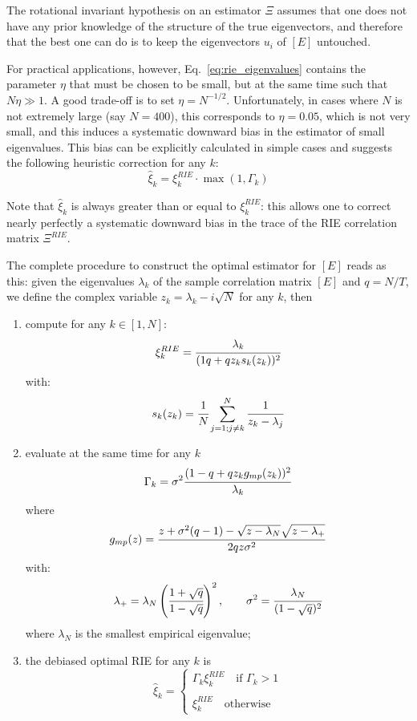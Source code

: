 The rotational invariant hypothesis on an estimator $\Xi$ assumes that one does not have any prior knowledge of the structure of the true eigenvectors, and therefore that the best one can do is to keep the eigenvectors $u_i$ of $[E]$ untouched.

For practical applications, however, Eq.~\ref{eq:rie_eigenvalues} contains the parameter $\eta$ that must be chosen to be small, but at the same time such that $N\eta \gg 1$. A good trade-off is to set $\eta = N^{-1/2}$. Unfortunately, in cases where $N$ is not extremely large (say $N = 400$), this corresponds to $\eta = 0.05$, which is not very small, and this induces a systematic downward bias in the estimator of small
eigenvalues. This bias can be explicitly calculated in simple cases and suggests the following heuristic correction for any $k$:
\begin{equation}
\hat{\xi}_k = \xi^{RIE}_k \cdot \max(1, \Gamma_k)
\end{equation}

Note that $\hat{\xi}_k$ is always greater than or equal to $\xi^{RIE}_k$: this allows one to correct nearly perfectly a systematic
downward bias in the trace of the RIE correlation matrix $\Xi^{RIE}$.

The complete procedure to construct the optimal estimator for $[E]$ reads as this: given the eigenvalues $\lambda_k$ of the sample correlation matrix $[E]$ and $q=N/T$, we define the complex variable $z_k =\lambda_k-i\sqrt{N}$ for any $k$, then

\begin{enumerate}
\item compute for any $k\in[1,N]$:
\begin{equation}
\xi^{RIE}_k=\cfrac{\lambda_k}{(1q+qz_ks_k(z_k))^2}
\end{equation}
with:
\begin{equation}
s_k(z_k)=\cfrac{1}{N}\sum_{j=1;j\neq k}^{N}\cfrac{1}{z_k-\lambda_j}
\end{equation}
\item evaluate at the same time for any $k$
\begin{equation}
\Gamma_k=\sigma^2\cfrac{(1-q+q z_k g_{mp}(z_k))^2}{\lambda_k}
\end{equation}
where
\begin{equation}
g_{mp}(z) = \cfrac{z+\sigma^2(q-1)-\sqrt{z-\lambda_N}\sqrt{z-\lambda_+}}{2qz\sigma^2}
\end{equation}
with:
\begin{equation}
\lambda_+ = \lambda_N\left(\cfrac{1+\sqrt{q}}{1-\sqrt{q}}\right)^2,\quad\quad\sigma^2=\cfrac{\lambda_N}{(1-\sqrt{q})^2}
\end{equation}
where $\lambda_N$ is the smallest empirical eigenvalue;
\item the debiased optimal RIE for any $k$ is
\begin{equation}
\hat{\xi}_k =
\begin{cases}
\Gamma_k\xi^{RIE}_k\quad\text{if }\Gamma_k>1\\ \\
\xi^{RIE}_k\quad\text{otherwise}
\end{cases}
\end{equation}
\end{enumerate}

